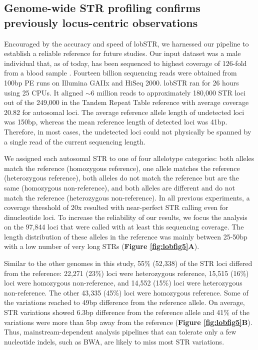 \subsection{Genome-wide STR profiling confirms previously locus-centric observations}
Encouraged by the accuracy and speed of lobSTR, we harnessed our pipeline to establish a reliable reference for future studies. Our input dataset was a male individual that, as of today, has been sequenced to highest coverage of 126-fold from a blood sample \cite{AjayParkerAbaanEtAl2011}. Fourteen billion sequencing reads were obtained from 100bp PE runs on Illumina GAIIx and HiSeq 2000. lobSTR ran for 26 hours using 25 CPUs. It aligned $\sim$6 million reads to approximately 180,000 STR loci out of the 249,000 in the Tandem Repeat Table reference with average coverage 20.82 for autosomal loci. The average reference allele length of undetected loci was 150bp, whereas the mean reference length of detected loci was 41bp. Therefore, in most cases, the undetected loci could not physically be spanned by a single read of the current sequencing length.

We assigned each autosomal STR to one of four allelotype categories: both alleles match the reference (homozygous reference), one allele matches the reference (heterozygous reference), both alleles do not match the reference but are the same (homozygous non-reference), and both alleles are different and do not match the reference (heterozygous non-reference). In all previous experiments, a coverage threshold of 20x resulted with near-perfect STR calling even for dinucleotide loci. To increase the reliability of our results, we focus the analysis on the 97,844 loci that were called with at least this sequencing coverage. The length distribution of these alleles in the reference was mainly between 25-50bp with a low number of very long STRs (\textbf{Figure \ref{fig:lobfig5}A}). 

Similar to the other genomes in this study, 55\% (52,338) of the STR loci differed from the reference: 22,271 (23\%) loci were heterozygous reference, 15,515 (16\%) loci were homozygous non-reference, and 14,552 (15\%) loci were heterozygous non-reference. The other 43,335 (45\%) loci were homozygous reference. Some of the variations reached to 49bp difference from the reference allele. On average, STR variations showed 6.3bp difference from the reference allele and 41\% of the variations were more than 5bp away from the reference (\textbf{Figure \ref{fig:lobfig5}B}). Thus, mainstream-dependent analysis pipelines that can tolerate only a few nucleotide indels, such as BWA, are likely to miss most STR variations.

